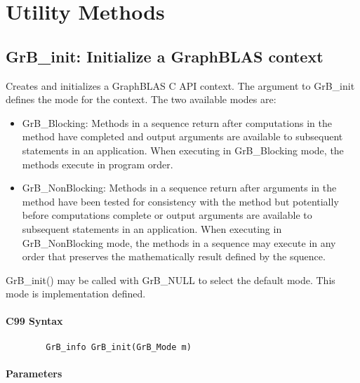 \section{Utility Methods}


\subsection{{\sf GrB\_init}: Initialize a GraphBLAS context}

Creates and initializes a GraphBLAS C API context.  The argument
to {\sf GrB\_init} defines the mode for the context.  The two
available modes are:

\begin{itemize}
\item {\sf GrB\_Blocking}: Methods in a sequence return after
computations in the method have completed and output arguments
are available to subsequent statements in an application.  When
executing in {\sf GrB\_Blocking} mode, the methods execute 
in program order.

\item {\sf GrB\_NonBlocking}: Methods in a sequence return after
arguments in the method have been tested for consistency with the
method but potentially before computations complete or output 
arguments are available to subsequent statements in an application.
When executing in {\sf GrB\_NonBlocking} mode, the methods 
in a sequence may execute in any order that preserves the 
mathematically result defined by the squence.

\end{itemize}

{\sf GrB\_init()} may be called with {\sf GrB\_NULL} to select 
the default mode.  This mode is implementation defined.

\paragraph{C99 Syntax}

\begin{verbatim}
        GrB_info GrB_init(GrB_Mode m)
\end{verbatim}


\paragraph{Parameters}

